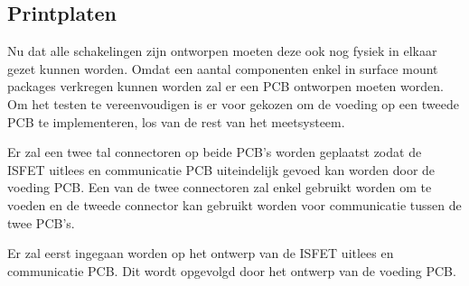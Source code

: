 \subsection{Printplaten}
Nu dat alle schakelingen zijn ontworpen moeten deze ook nog fysiek in elkaar gezet kunnen worden. Omdat een aantal componenten enkel in surface mount packages verkregen kunnen worden zal er een PCB ontworpen moeten worden. Om het testen te vereenvoudigen is er voor gekozen om de voeding op een tweede PCB te implementeren, los van de rest van het \si{\pH} meetsysteem.

Er zal een twee tal connectoren op beide PCB's worden geplaatst zodat de ISFET uitlees en communicatie PCB uiteindelijk gevoed kan worden door de voeding PCB. Een van de twee connectoren zal enkel gebruikt worden om te voeden en de tweede connector kan gebruikt worden voor communicatie tussen de twee PCB's.

Er zal eerst ingegaan worden op het ontwerp van de ISFET uitlees en communicatie PCB. Dit wordt opgevolgd door het ontwerp van de voeding PCB.




